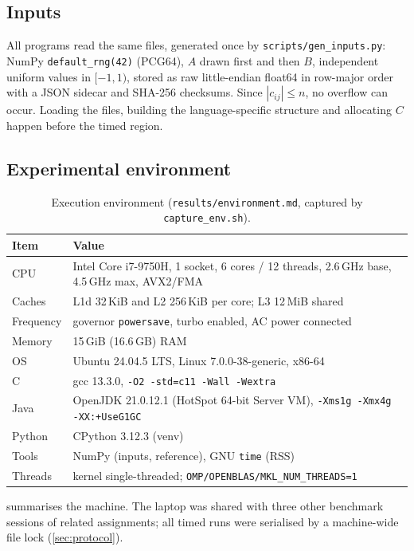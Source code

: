 \documentclass[conference,a4paper]{IEEEtran}
\begin{document}
\subsection{Inputs}
All programs read the same files, generated once by \texttt{scripts/gen\_inputs.py}: NumPy
\texttt{default\_rng(42)} (PCG64), $A$ drawn first and then $B$, independent uniform values in $[-1,1)$, stored as
raw little-endian float64 in row-major order with a JSON sidecar and SHA-256 checksums. Since $|c_{ij}|\le n$, no
overflow can occur. Loading the files, building the language-specific structure and allocating $C$ happen before
the timed region.

\subsection{Experimental environment}
\begin{table}[t]
\centering
\caption{Execution environment (\texttt{results/environment.md}, captured by \texttt{capture\_env.sh}).}
\label{tab:env}
\footnotesize
\begin{tabular}{@{}lp{}@{}}
\toprule
Item & Value \\
\midrule
CPU & Intel Core i7-9750H, 1 socket, 6 cores / 12 threads, 2.6\,GHz base, 4.5\,GHz max, AVX2/FMA \\
Caches & L1d 32\,KiB and L2 256\,KiB per core; L3 12\,MiB shared \\
Frequency & governor \texttt{powersave}, turbo enabled, AC power connected \\
Memory & 15\,GiB (16.6\,GB) RAM \\
OS & Ubuntu 24.04.5 LTS, Linux 7.0.0-38-generic, x86-64 \\
C & gcc 13.3.0, \texttt{-O2 -std=c11 -Wall -Wextra} \\
Java & OpenJDK 21.0.12.1 (HotSpot 64-bit Server VM), \texttt{-Xms1g -Xmx4g -XX:+UseG1GC} \\
Python & CPython 3.12.3 (venv) \\
Tools & NumPy \NumpyVersion{} (inputs, reference), GNU \texttt{time} (RSS) \\
Threads & kernel single-threaded; \texttt{OMP/OPENBLAS/MKL\_NUM\_THREADS=1} \\
\bottomrule
\end{tabular}
\end{table}
 summarises the machine. The laptop was shared with three other benchmark sessions of related
assignments; all timed runs were serialised by a machine-wide file lock (\cref{sec:protocol}).
\end{document}
